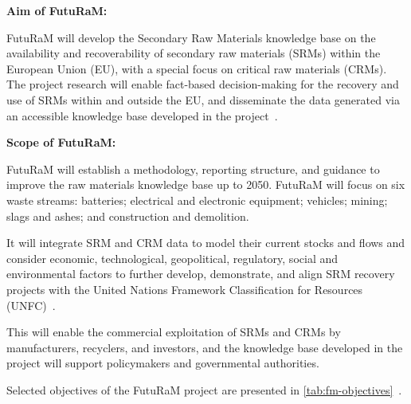 \textbf{Aim of FutuRaM:}

FutuRaM will develop the Secondary Raw Materials knowledge base on the availability and recoverability of secondary raw materials (SRMs) within the European Union (EU), with a special focus on critical raw materials (CRMs). The project research will enable fact-based decision-making for the recovery and use of SRMs within and outside the EU, and disseminate the data generated via an accessible knowledge base developed in the project~\cite{futuram2022ca,futuram2022pmp}.

\textbf{Scope of FutuRaM:}

FutuRaM will establish a methodology, reporting structure, and guidance to improve the raw materials knowledge base up to 2050. FutuRaM will focus on six waste streams: batteries; electrical and electronic equipment; vehicles; mining; slags and ashes; and construction and demolition.

It will integrate SRM and CRM data to model their current stocks and flows and consider economic, technological, geopolitical, regulatory, social and environmental factors to further develop, demonstrate, and align SRM recovery projects with the United Nations Framework Classification for Resources (UNFC)~\cite{unfc2023}.

This will enable the commercial exploitation of SRMs and CRMs by manufacturers, recyclers, and investors, and the knowledge base developed in the project will support policymakers and governmental authorities.



Selected objectives of the FutuRaM project are presented in \autoref{tab:fm-objectives}~\cite{futuram2022ca,futuram2022pmp}.

